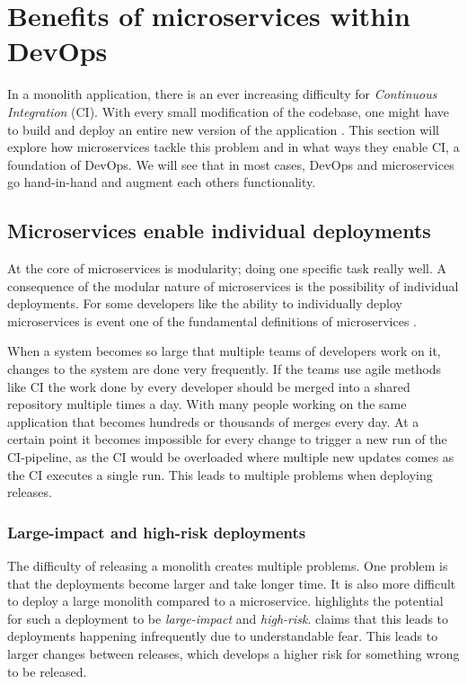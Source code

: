 \documentclass[a4paper]{article}
\begin{document}

\section{Benefits of microservices within DevOps}
\label{sec:benefits}
In a monolith application, there is an ever increasing difficulty for \textit{Continuous Integration} (CI). With every small modification of the codebase, one might have to build and deploy an entire new version of the application \cite{Jeremiah}. This section will explore how microservices tackle this problem and in what ways they enable CI, a foundation of DevOps. We will see that in most cases, DevOps and microservices go hand-in-hand and augment each others functionality.

\subsection{Microservices enable individual deployments}
At the core of microservices is modularity; doing one specific task really well. A consequence of the modular nature of microservices is the possibility of individual deployments. For some developers like \citeauthor{Newman2015} the ability to individually deploy microservices is event one of the fundamental definitions of microservices \cite{Newman2015}.

When a system becomes so large that multiple teams of developers work on it, changes to the system are done very frequently. If the teams use agile methods like CI the work done by every developer should be merged into a shared repository multiple times a day. With many people working on the same application that becomes hundreds or thousands of merges every day. At a certain point it becomes impossible for every change to trigger a new run of the CI-pipeline, as the CI would be overloaded where multiple new updates comes as the CI executes a single run. This leads to multiple problems when deploying releases.

\subsubsection{Large-impact and high-risk deployments}
The difficulty of releasing a monolith creates multiple problems. One problem is that the deployments become larger and take longer time. It is also more difficult to deploy a large monolith compared to a microservice. \citeauthor{Newman2015} highlights the potential for such a deployment to be \textit{large-impact} and \textit{high-risk}. \citeauthor{Newman2015} claims that this leads to deployments happening infrequently due to understandable fear. This leads to larger changes between releases, which develops a higher risk for something wrong to be released. \cite[p.~6]{Newman2015}
\end{document}
